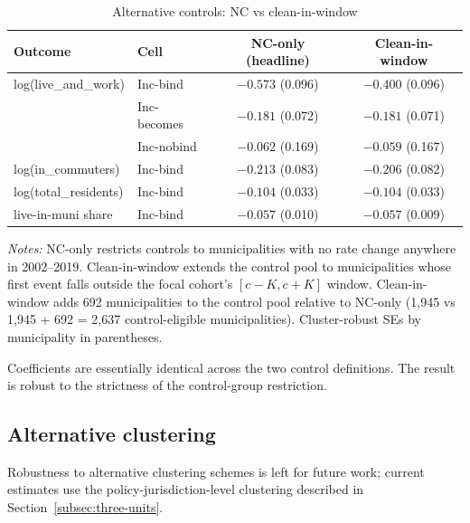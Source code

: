 \documentclass[12pt]{article}
\begin{document}
\begin{table}[H]
    \centering
    \caption{Alternative controls: NC vs clean-in-window}
    \label{tab:rob-controls}
    \small
    \begin{tabular}{llcc}
        \toprule
        Outcome & Cell & NC-only (headline) & Clean-in-window \\
        \midrule
        log(live\_and\_work)    & Inc-bind     & $-0.573$ (0.096) & $-0.400$ (0.096) \\
                                & Inc-becomes  & $-0.181$ (0.072) & $-0.181$ (0.071) \\
                                & Inc-nobind   & $-0.062$ (0.169) & $-0.059$ (0.167) \\
        log(in\_commuters)      & Inc-bind     & $-0.213$ (0.083) & $-0.206$ (0.082) \\
        log(total\_residents)   & Inc-bind     & $-0.104$ (0.033) & $-0.104$ (0.033) \\
        live-in-muni share         & Inc-bind     & $-0.057$ (0.010) & $-0.057$ (0.009) \\
        \bottomrule
    \end{tabular}
    \vspace{0.3em}
    \begin{minipage}{0.92\textwidth}
        \footnotesize \textit{Notes:} NC-only restricts controls to
        municipalities with no rate change anywhere in 2002--2019.
        Clean-in-window extends the control pool to municipalities whose first
        event falls outside the focal cohort's $[c - K, c + K]$ window.
        Clean-in-window adds 692 municipalities to the control pool relative to
        NC-only (1,945 vs 1,945 + 692 = 2,637 control-eligible municipalities).
        Cluster-robust SEs by municipality in parentheses.
    \end{minipage}
\end{table}

Coefficients are essentially identical across the two control
definitions. The result is robust to the strictness of the
control-group restriction.

\subsection{Alternative clustering}
\label{app:rob-cluster}

Robustness to alternative clustering schemes is left for future
work; current estimates use the policy-jurisdiction-level clustering
described in Section~\ref{subsec:three-units}.
\end{document}
